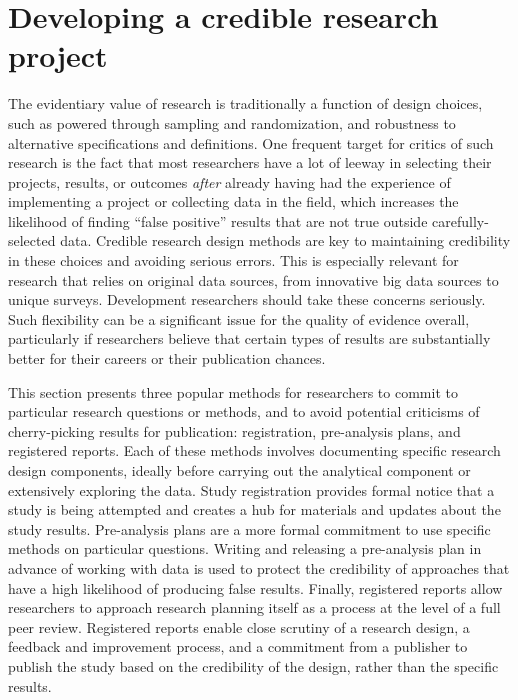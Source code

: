 
\section{Developing a credible research project}

The evidentiary value of research is traditionally a function of design choices,
such as powered through sampling and randomization,
and robustness to alternative specifications and definitions.
One frequent target for critics of such research
is the fact that most researchers have a lot of leeway
in selecting their projects, results, or outcomes
\textit{after} already having had the experience of implementing a project
or collecting data in the field,
which increases the likelihood of finding ``false positive''
results that are not true outside carefully-selected data.
Credible research design methods are key to maintaining credibility
in these choices and avoiding serious errors.
This is especially relevant for research that relies on original data sources,
from innovative big data sources to unique surveys.
Development researchers should take these concerns seriously.
Such flexibility can be a significant issue for the quality of evidence overall,
particularly if researchers believe that certain types of results
are substantially better for their careers or their publication chances.

This section presents three popular methods
for researchers to commit to particular research questions or methods,
and to avoid potential criticisms of cherry-picking results for publication:
registration, pre-analysis plans, and registered reports.
Each of these methods involves documenting specific research design components,
ideally before carrying out the analytical component or extensively exploring the data.
Study registration provides formal notice that a study is being attempted
and creates a hub for materials and updates about the study results.
Pre-analysis plans are a more formal commitment
to use specific methods on particular questions.
Writing and releasing a pre-analysis plan
in advance of working with data is used to protect the credibility
of approaches that have a high likelihood of producing false results.
Finally, registered reports allow researchers to approach research planning itself
as a process at the level of a full peer review.
Registered reports enable close scrutiny of a research design,
a feedback and improvement process,
and a commitment from a publisher to publish the study
based on the credibility of the design, rather than the specific results.

